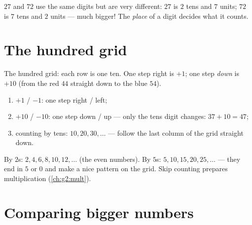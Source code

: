 \begin{example}\label{ex:g1:tens:place}
$27$ and $72$ use the same digits but are very different: $27$ is
$2$ tens and $7$ units; $72$ is $7$ tens and $2$ units --- much
bigger! The \emph{place} of a digit decides what it counts.
\end{example}

\section{The hundred grid}

\begin{omfigure}

{\small The hundred grid: each row is one ten. One step right is
$+1$; one step \emph{down} is $+10$ (from the red $44$ straight down
to the blue $54$).}
\end{omfigure}

\begin{method}\label{met:g1:tens:grid}
\begin{enumerate}
  \item $+1$ / $-1$: one step right / left;
  \item $+10$ / $-10$: one step down / up --- only the tens digit
        changes: $37 + 10 = 47$;
  \item counting by tens: $10, 20, 30, \dots$ --- follow the last
        column of the grid straight down.
\end{enumerate}
\end{method}

\begin{example}\label{ex:g1:tens:skip}
By $2$s: $2, 4, 6, 8, 10, 12, \dots$ (the even numbers). By $5$s:
$5, 10, 15, 20, 25, \dots$ --- they end in $5$ or $0$ and make a
nice pattern on the grid. Skip counting prepares multiplication
(\cref{ch:g2:mult}).
\end{example}

\section{Comparing bigger numbers}


